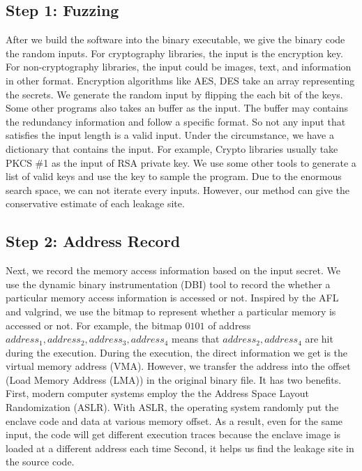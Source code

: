\subsection{Step 1: Fuzzing}
After we build the software into the binary executable, we give the binary code the random inputs. For cryptography libraries, the input is the encryption key. For non-cryptography libraries, the input could be images, text, and information in other format. Encryption algorithms like AES, DES take an array representing the secrets. We generate the random input by flipping the each bit of the keys. Some other programs also takes an buffer as the input. The buffer may contains the redundancy information and follow a specific format. So not any input that satisfies the input length is a valid input. Under the circumstance, we have a dictionary that contains the input. For example, Crypto libraries usually take PKCS \#1 as the input of RSA private key. We use some other tools to generate a list of valid keys and use the key to sample the program. Due to the enormous search space, we can not iterate every inputs. However, our method can give the conservative  estimate of each leakage site. 
\subsection{Step 2: Address Record}
Next, we record the memory access information based on the input secret. We use the dynamic binary instrumentation (DBI) tool to record the whether a particular memory access information is accessed or not. Inspired by the AFL and valgrind, we use the bitmap to represent whether a particular memory is accessed or not. For example, the bitmap ${0101}$ of address $address_1, address_2, address_3, address_4$ means that $address_2, address_4$ are hit during the execution. During the execution, the direct information we get is the virtual memory address (VMA). However, we transfer the address into the offset (Load Memory Address (LMA)) in the original binary file. It has two benefits. First, modern computer systems employ the the Address Space Layout Randomization (ASLR). With ASLR, the operating system randomly put the enclave code and data at various memory offset. As a result, even for the same input, the code will get different execution traces because the enclave image is loaded at a different address each time Second, it helps us find the leakage site in the source code.


